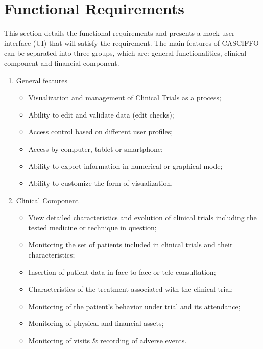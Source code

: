 \section{Functional Requirements}
\label{sec:functional-reqs}
This section details the functional requirements and presents a mock user interface (UI) that will satisfy the requirement.
The main features of CASCIFFO can be separated into three groups, which are: general functionalities, clinical component and financial component.  
\begin{enumerate}
    \item General features
        \begin{itemize}
            \item Visualization and management of Clinical Trials as a process; 
            \item Ability to edit and validate data (edit checks);
            \item Access control based on different user profiles; 
            \item Access by computer, tablet or smartphone; 
            \item Ability to export information in numerical or graphical mode; 
            \item Ability to customize the form of visualization.
        \end{itemize}
    \item Clinical Component
        \begin{itemize}
           \item View detailed characteristics and evolution of clinical trials including the tested medicine or technique in question;
           \item Monitoring the set of patients included in clinical trials and their characteristics;
           \item Insertion of patient data in face-to-face or tele-consultation;
           \item Characteristics of the treatment associated with the clinical trial;
           \item Monitoring of the patient’s behavior under trial and its attendance;
           \item Monitoring of physical and financial assets;
           \item Monitoring of visits \& recording of adverse events.
        \end{itemize}
\end{enumerate}


